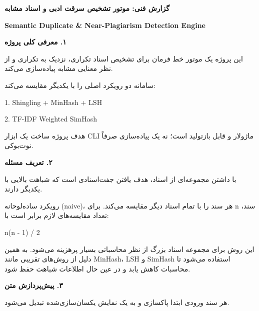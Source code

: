 \documentclass[11pt]{article}
\begin{document}
\begin{center}
{\Large\bfseries ‏گزارش فنی: موتور تشخیص سرقت ادبی و اسناد مشابه}
\end{center}

\smallskip
{\bfseries ‏Semantic Duplicate \& Near-Plagiarism Detection Engine}\smallskip


\medskip
{\large\bfseries ‏۱. معرفی کلی پروژه}\medskip


\noindent ‏این پروژه یک موتور خط فرمان برای تشخیص اسناد تکراری، نزدیک به تکراری و از نظر معنایی مشابه پیاده‌سازی می‌کند.\par

\noindent ‏سامانه دو رویکرد اصلی را با یکدیگر مقایسه می‌کند:\par

\noindent ‏1. Shingling + MinHash + LSH\par

\noindent ‏2. TF-IDF Weighted SimHash\par

\noindent ‏هدف پروژه ساخت یک ابزار CLI ماژولار و قابل بازتولید است؛ نه یک پیاده‌سازی صرفاً نوت‌بوکی.\par

\medskip\noindent\hrulefill\medskip

\medskip
{\large\bfseries ‏۲. تعریف مسئله}\medskip


\noindent ‏با داشتن مجموعه‌ای از اسناد، هدف یافتن جفت‌اسنادی است که شباهت بالایی با یکدیگر دارند.\par

\noindent ‏رویکرد ساده‌لوحانه (naive)، هر سند را با تمام اسناد دیگر مقایسه می‌کند. برای n سند، تعداد مقایسه‌های لازم برابر است با:\par

{\mycode
\begin{flushleft}
n(n - 1) / 2
\end{flushleft}}

\noindent ‏این روش برای مجموعه اسناد بزرگ از نظر محاسباتی بسیار پرهزینه می‌شود. به همین دلیل از روش‌های تقریبی مانند MinHash، LSH و SimHash استفاده می‌شود تا محاسبات کاهش یابد و در عین حال اطلاعات شباهت حفظ شود.\par

\medskip\noindent\hrulefill\medskip

\medskip
{\large\bfseries ‏۳. پیش‌پردازش متن}\medskip


\noindent ‏هر سند ورودی ابتدا پاکسازی و به یک نمایش یکسان‌سازی‌شده تبدیل می‌شود.\par
\end{document}
